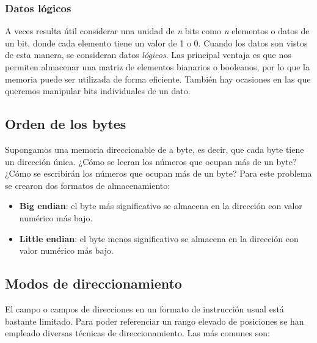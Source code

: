 \begin{subs}
  \subsubsection{Datos lógicos}

  A veces resulta útil considerar una unidad de \textit{n} bits como \textit{n} elementos o datos de un bit, donde cada elemento tiene un valor de 1 o 0. Cuando los datos son vistos de esta manera, se consideran datos \textit{lógicos}.
  Las principal ventaja es que nos permiten almacenar una matriz de elementos bianarios o booleanos, por lo que la memoria puede ser utilizada de forma eficiente. También hay ocasiones en las que queremos manipular bits individuales de un dato.
\end{subs}

\subsection{Orden de los bytes}

Supongamos una memoria direccionable de a byte, es decir, que cada byte tiene un dirección única. ¿Cómo se leeran los números que ocupan más de un byte? ¿Cómo se escribirán los números que ocupan más de un byte? 
Para este problema se crearon dos formatos de almacenamiento:

\begin{itemize}
  \item \textbf{Big endian}: el byte más significativo se almacena en la dirección con valor numérico más bajo.
  \item \textbf{Little endian}: el byte menos significativo se almacena en la dirección con valor numérico más bajo.
\end{itemize}

\begin{figure}[H]
  \hspace*{\fill}
  \hfill
  \hspace*{\fill}
\end{figure}

\subsection{Modos de direccionamiento}

El campo o campos de direcciones en un formato de instrucción usual está bastante limitado. Para poder referenciar un rango elevado de posiciones se han empleado diversas técnicas de direccionamiento. Las más comunes son:

